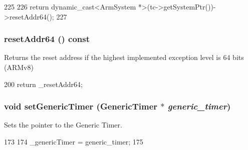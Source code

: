 \begin{DoxyCode}
225 {
226     return dynamic_cast<ArmSystem *>(tc->getSystemPtr())->resetAddr64();
227 }
\end{DoxyCode}
\hypertarget{classArmSystem_ab3ee6a4f5ccf871a1ec729401efa6df4}{
\subsubsection[{resetAddr64}]{ resetAddr64 () const}}
\label{classArmSystem_ab3ee6a4f5ccf871a1ec729401efa6df4}
Returns the reset address if the highest implemented exception level is 64 bits (ARMv8) 


\begin{DoxyCode}
200 { return _resetAddr64; }
\end{DoxyCode}
\hypertarget{classArmSystem_a8d0ae73d8ff6797f8b38801bffd82454}{
\subsubsection[{setGenericTimer}]{\setlength{\rightskip}{0pt plus 5cm}void setGenericTimer ({\bf GenericTimer} $\ast$ {\em generic\_\-timer})}}
\label{classArmSystem_a8d0ae73d8ff6797f8b38801bffd82454}
Sets the pointer to the Generic Timer. 


\begin{DoxyCode}
173     {
174         _genericTimer = generic_timer;
175     }
\end{DoxyCode}


